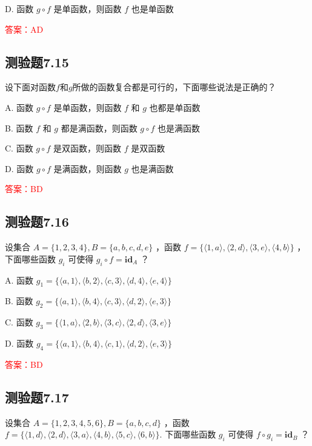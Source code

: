 \documentclass[UTF8, heading=true]{ctexart}
\begin{document}
D. 函数 $g \circ f$ 是单函数，则函数 $f$ 也是单函数

\textcolor{red}{答案：AD}

\subsection{测验题7.15}

设下面对函数$f$和$g$所做的函数复合都是可行的，下面哪些说法是正确的？

A. 函数 $g \circ f$ 是单函数，则函数 $f$ 和 $g$ 也都是单函数

B. 函数 $f$ 和 $g$ 都是满函数，则函数 $g \circ f$ 也是满函数

C. 函数 $g \circ f$ 是双函数，则函数 $f$ 是双函数

D. 函数 $g \circ f$ 是满函数，则函数 $g$ 也是满函数

\textcolor{red}{答案：BD}

\subsection{测验题7.16}

设集合 $A=\{1,2,3,4\}, B=\{a, b, c, d, e\}$ ，函数 $f=\{\langle 1, a\rangle,\langle 2, d\rangle,\langle 3, e\rangle,\langle 4, b\rangle\}$ ，下面哪些函数 $g_i$ 可使得 $g_i \circ f=\mathbf{i d}_A$ ？

A. 函数 $g_1=\{\langle a, 1\rangle,\langle b, 2\rangle,\langle c, 3\rangle,\langle d, 4\rangle,\langle e, 4\rangle\}$

B. 函数 $g_2=\{\langle a, 1\rangle,\langle b, 4\rangle,\langle c, 3\rangle,\langle d, 2\rangle,\langle e, 3\rangle\}$

C. 
函数 $g_3=\{\langle 1, a\rangle,\langle 2, b\rangle,\langle 3, c\rangle,\langle 2, d\rangle,\langle 3, e\rangle\}$

D. 
函数 $g_4=\{\langle a, 1\rangle,\langle b, 4\rangle,\langle c, 1\rangle,\langle d, 2\rangle,\langle e, 3\rangle\}$


\textcolor{red}{答案：BD}

\subsection{测验题7.17}

设集合 $A=\{1,2,3,4,5,6\}, B=\{a, b, c, d\}$ ，函数 $f=\{\langle 1, d\rangle,\langle 2, d\rangle,\langle 3, a\rangle,\langle 4, b\rangle,\langle 5, c\rangle,\langle 6, b\rangle\}$. 下面哪些函数 $g_i$ 可使得 $f \circ g_i=\mathbf{i d}_B$ ？
\end{document}
